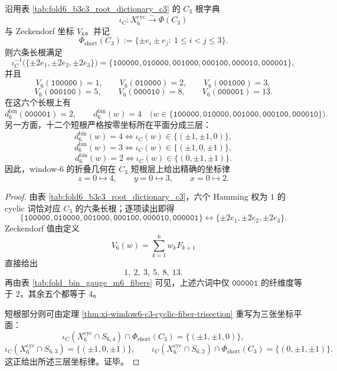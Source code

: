 \begin{theorem}\label{thm:conclusion-window6-c3-rootlength-fiber-coordinate-law}
沿用表 \ref{tab:fold6_b3c3_root_dictionary_c3} 的 \(C_3\) 根字典
\[
\iota_C:X_6^{\mathrm{cyc}}\xrightarrow{\sim}\Phi(C_3)
\]
与 Zeckendorf 坐标 \(V_6\)。并记
\[
\Phi_{\mathrm{short}}(C_3):=\{\pm e_i\pm e_j:\ 1\le i<j\le 3\}.
\]
则六条长根满足
\[
\iota_C^{-1}\bigl(\{\pm 2e_1,\pm 2e_2,\pm 2e_3\}\bigr)
=
\{
\mathtt{100000},\mathtt{010000},\mathtt{001000},
\mathtt{000100},\mathtt{000010},\mathtt{000001}
\},
\]
并且
\[
V_6(\mathtt{100000})=1,\qquad
V_6(\mathtt{010000})=2,\qquad
V_6(\mathtt{001000})=3,
\]
\[
V_6(\mathtt{000100})=5,\qquad
V_6(\mathtt{000010})=8,\qquad
V_6(\mathtt{000001})=13.
\]
在这六个长根上有
\[
d_6^{\mathrm{bin}}(\mathtt{000001})=2,
\qquad
d_6^{\mathrm{bin}}(w)=4
\quad
\bigl(
w\in
\{
\mathtt{100000},\mathtt{010000},\mathtt{001000},
\mathtt{000100},\mathtt{000010}
\}
\bigr).
\]
另一方面，十二个短根严格按零坐标所在平面分成三层：
\[
d_6^{\mathrm{bin}}(w)=4
\iff
\iota_C(w)\in\{(\pm 1,\pm 1,0)\},
\]
\[
d_6^{\mathrm{bin}}(w)=3
\iff
\iota_C(w)\in\{(\pm 1,0,\pm 1)\},
\]
\[
d_6^{\mathrm{bin}}(w)=2
\iff
\iota_C(w)\in\{(0,\pm 1,\pm 1)\}.
\]
因此，window-\(6\) 的折叠几何在 \(C_3\) 短根层上给出精确的坐标律
\[
z=0\mapsto 4,\qquad
y=0\mapsto 3,\qquad
x=0\mapsto 2.
\]
\end{theorem}
\begin{proof}
由表 \ref{tab:fold6_b3c3_root_dictionary_c3}，六个 Hamming 权为 \(1\) 的 cyclic 词恰对应 \(C_3\) 的六条长根；逐项读出即得
\[
\{
\mathtt{100000},\mathtt{010000},\mathtt{001000},
\mathtt{000100},\mathtt{000010},\mathtt{000001}
\}
\longleftrightarrow
\{\pm 2e_1,\pm 2e_2,\pm 2e_3\}.
\]
Zeckendorf 值由定义
\[
V_6(w)=\sum_{k=1}^{6}w_kF_{k+1}
\]
直接给出
\[
1,\ 2,\ 3,\ 5,\ 8,\ 13.
\]
再由表 \ref{tab:fold_bin_gauge_m6_fibers} 可见，上述六词中仅 \(\mathtt{000001}\) 的纤维度等于 \(2\)，其余五个都等于 \(4\)。

短根部分则可由定理 \ref{thm:xi-window6-c3-cyclic-fiber-trisection} 重写为三张坐标平面：
\[
\iota_C(X_6^{\mathrm{cyc}}\cap S_{6,4})
\cap
\Phi_{\mathrm{short}}(C_3)
=
\{(\pm 1,\pm 1,0)\},
\]
\[
\iota_C(X_6^{\mathrm{cyc}}\cap S_{6,3})
=
\{(\pm 1,0,\pm 1)\},
\qquad
\iota_C(X_6^{\mathrm{cyc}}\cap S_{6,2})
\cap
\Phi_{\mathrm{short}}(C_3)
=
\{(0,\pm 1,\pm 1)\}.
\]
这正给出所述三层坐标律。证毕。
\end{proof}


